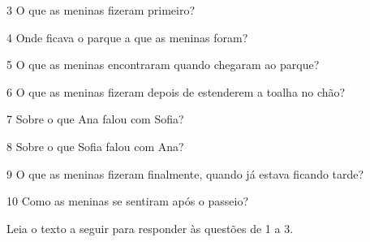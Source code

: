 \num{3} O que as meninas fizeram primeiro?


\num{4} Onde ficava o parque a que as meninas foram?



\num{5} O que as meninas encontraram quando chegaram ao parque?



\num{6} O que as meninas fizeram depois de estenderem a toalha no chão?



\num{7} Sobre o que Ana falou com Sofia?


\num{8} Sobre o que Sofia falou com Ana?



\num{9} O que as meninas fizeram finalmente, quando já estava ficando tarde?



\num{10} Como as meninas se sentiram após o passeio?


\pagebreak
{}

Leia o texto a seguir para responder às questões de 1 a 3.

